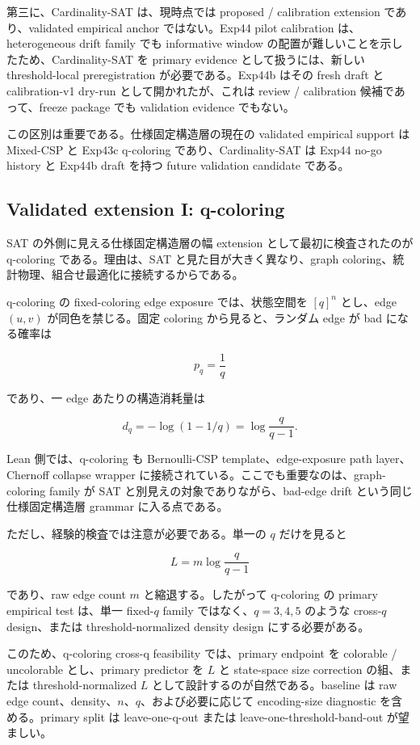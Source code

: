 \documentclass[12pt,a4paper]{article}
\begin{document}
第三に、Cardinality-SAT は、現時点では proposed / calibration extension であり、validated empirical anchor ではない。Exp44 pilot calibration は、heterogeneous drift family でも informative window の配置が難しいことを示したため、Cardinality-SAT を primary evidence として扱うには、新しい threshold-local preregistration が必要である。Exp44b はその fresh draft と calibration-v1 dry-run として開かれたが、これは review / calibration 候補であって、freeze package でも validation evidence でもない。

この区別は重要である。仕様固定構造層の現在の validated empirical support は Mixed-CSP と Exp43c q-coloring であり、Cardinality-SAT は Exp44 no-go history と Exp44b draft を持つ future validation candidate である。

\subsection{Validated extension I: q-coloring}\label{validated-extension-i-q-coloring}

SAT の外側に見える仕様固定構造層の幅 extension として最初に検査されたのが q-coloring である。理由は、SAT と見た目が大きく異なり、graph coloring、統計物理、組合せ最適化に接続するからである。

q-coloring の fixed-coloring edge exposure では、状態空間を \([q]^n\) とし、edge \((u,v)\) が同色を禁じる。固定 coloring から見ると、ランダム edge が bad になる確率は

\[
p_{q}=\frac{1}{q}
\]

であり、一 edge あたりの構造消耗量は

\[
d_{q} = -\log(1-1/q) = \log\frac{q}{q-1}.
\]

Lean 側では、q-coloring も Bernoulli-CSP template、edge-exposure path layer、Chernoff collapse wrapper に接続されている。ここでも重要なのは、graph-coloring family が SAT と別見えの対象でありながら、bad-edge drift という同じ 仕様固定構造層 grammar に入る点である。

ただし、経験的検査では注意が必要である。単一の \(q\) だけを見ると

\[
L=m\log\frac{q}{q-1}
\]

であり、raw edge count \(m\) と縮退する。したがって q-coloring の primary empirical test は、単一 fixed-\(q\) family ではなく、\(q=3,4,5\) のような cross-\(q\) design、または threshold-normalized density design にする必要がある。

このため、q-coloring cross-q feasibility では、primary endpoint を colorable / uncolorable とし、primary predictor を \(L\) と state-space size correction の組、または threshold-normalized \(L\) として設計するのが自然である。baseline は raw edge count、density、\(n\)、\(q\)、および必要に応じて encoding-size diagnostic を含める。primary split は leave-one-q-out または leave-one-threshold-band-out が望ましい。
\end{document}
